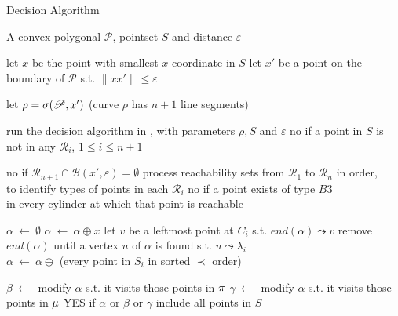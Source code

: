 \documentclass[a4paper,UKenglish]{lipics}
\newcommand{\eps}{\varepsilon}
\newcommand{\eq}{{\ \leftarrow\ }}
\newcommand{\CR}{{\mathscr R}}
\newcommand{\CB}{{\mathscr B}}
\newcommand{\Pol}{{\mathscr P}}
\newcommand{\R}{\CR}
\newcommand{\lei}{\prec}
\newcommand{\ap}{\oplus}
\newcommand{\pset}{S}
\newcommand{\see}{\leadsto}
\newcommand{\lme}[1]{{\lambda_{#1}}}
\begin{document}
\begin{algorithm} [h]
\caption {{\sc Decision Algorithm }} 
\label{alg:dec}
\begin{algorithmic}[1]	
		\baselineskip

	\vspace{0.3em}
	\REQUIRE  A convex polygonal $\Pol$, pointset $\pset$ and distance $\eps$

\STATE let $x$ be the point with 
smallest $x$-coordinate in $\pset$
\STATE let $x'$ be a point on the boundary of $\Pol$
s.t.   $\|xx'\| \le \eps$

\STATE let $\rho = \bounC{x'}$ (curve $\rho$ has $n+1$ line segments) 

\vspace{0.1 in}
	\STATE run the decision algorithm in \cite{cccg11}, 
	with parameters $\rho, \pset$ and $\eps$
	 {\sc no} if a point in $\pset$ 
is not in any $\R_{i}$, $1\le i \le n+1$  \label{l:everyReach}

	 {\sc no} if $\R_{n+1} \cap \CB(x',\eps) = \emptyset$ \label{l:last}
	\STATE process reachability sets from $\R_1$ to $\R_n$ in order, \\to identify types of points in each $\R_i$ \label{l:identifytypes}
	 {\sc no} if a point exists of type  $B3$ \\ in every cylinder at which that point is reachable  \label{l:B3}

\label{l:typeB}


	
\vspace{0.2 in}
\STATE  $\alpha \eq \emptyset$ \label{l:init1}
	\STATE  $\alpha \eq \alpha \ap x$ \label{l:init1}
 	 \label{l:forCyl}	
			\STATE let $v$ be a leftmost point at $C_i$  s.t.  $end(\alpha) \see v$  \label{l:leftmost}	
	\IF { $v \neq \lme{i}$}	 \label{l:con}	
			\STATE remove $end(\alpha)$ until a vertex $u$ of $\alpha$ is found s.t. $u \see 		\lme{i}$ \label{l:rightmost} \\
	\ENDIF
	\STATE 
$\alpha \eq \alpha \ap$ 
(every point in $\pset_i$ in sorted $\lei$ order)



	\ENDFOR



	\STATE $\beta \eq$ modify $\alpha$ s.t. it visits those points in $\pi$ \label{l:lasttwo1}
	\STATE $\gamma \eq$ modify $\alpha$ s.t. it visits those points in $\mu$
\label{l:lasttwo2}
	\ENDIF
	 {\sc YES} if $\alpha$ or $\beta$ or $\gamma$ include all points in $\pset$

\end{algorithmic}
\end{algorithm}
\end{document}
